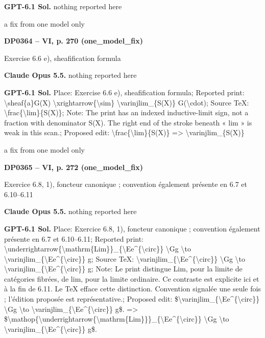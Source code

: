 \textbf{GPT-6.1 Sol.} nothing reported here\par
a fix from one model only\par
\par\noindent\hypertarget{DP0364}{}\textbf{DP0364 -- VI, p. 270 (one\_model\_fix)}\par
Exercise 6.6 e), sheafification formula\par
\textbf{Claude Opus 5.5.} nothing reported here\par
\textbf{GPT-6.1 Sol.} Place: Exercise 6.6 e), sheafification formula; Reported print: \textbackslash{}sheaf\{a\}G(X) \textbackslash{}xrightarrow\{\textbackslash{}sim\} \textbackslash{}varinjlim\_\{S(X)\} G(\textbackslash{}cdot); Source TeX: \textbackslash{}frac\{\textbackslash{}lim\}\{S(X)\}; Note: The print has an indexed inductive-limit sign, not a fraction with denominator S(X). The right end of the stroke beneath « lim » is weak in this scan.; Proposed edit: \textbackslash{}frac\{\textbackslash{}lim\}\{S(X)\} =\allowbreak > \textbackslash{}varinjlim\_\{S(X)\}\par
a fix from one model only\par
\par\noindent\hypertarget{DP0365}{}\textbf{DP0365 -- VI, p. 272 (one\_model\_fix)}\par
Exercice 6.8, 1), foncteur canonique ; convention également présente en 6.7 et 6.10–6.11\par
\textbf{Claude Opus 5.5.} nothing reported here\par
\textbf{GPT-6.1 Sol.} Place: Exercice 6.8, 1), foncteur canonique ; convention également présente en 6.7 et 6.10–6.11; Reported print: \textbackslash{}underrightarrow\{\textbackslash{}mathrm\{Lim\}\}\_\{\textbackslash{}Ee\textasciicircum{}\{\textbackslash{}circ\}\} \textbackslash{}Gg \textbackslash{}to \textbackslash{}varinjlim\_\{\textbackslash{}Ee\textasciicircum{}\{\textbackslash{}circ\}\} g; Source TeX: \textbackslash{}varinjlim\_\{\textbackslash{}Ee\textasciicircum{}\{\textbackslash{}circ\}\} \textbackslash{}Gg \textbackslash{}to \textbackslash{}varinjlim\_\{\textbackslash{}Ee\textasciicircum{}\{\textbackslash{}circ\}\} g; Note: Le print distingue Lim, pour la limite de catégories fibrées, de lim, pour la limite ordinaire. Ce contraste est explicite ici et à la fin de 6.11. Le TeX efface cette distinction. Convention signalée une seule fois ; l'édition proposée est représentative.; Proposed edit: \$\textbackslash{}varinjlim\_\{\textbackslash{}Ee\textasciicircum{}\{\textbackslash{}circ\}\} \textbackslash{}Gg \textbackslash{}to   \textbackslash{}varinjlim\_\{\textbackslash{}Ee\textasciicircum{}\{\textbackslash{}circ\}\} g\$. =\allowbreak > \$\textbackslash{}mathop\{\textbackslash{}underrightarrow\{\textbackslash{}mathrm\{Lim\}\}\}\_\{\textbackslash{}Ee\textasciicircum{}\{\textbackslash{}circ\}\} \textbackslash{}Gg \textbackslash{}to   \textbackslash{}varinjlim\_\{\textbackslash{}Ee\textasciicircum{}\{\textbackslash{}circ\}\} g\$.\par
